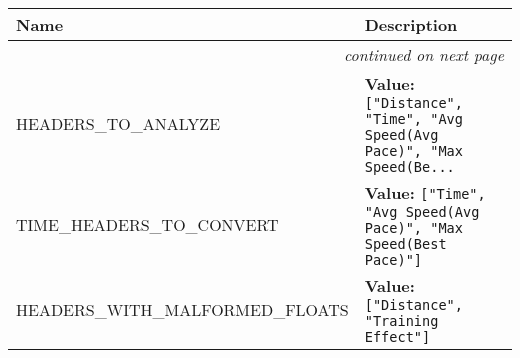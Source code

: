     \vspace{-1cm}
\hspace{\varindent}\begin{longtable}{|p{\varnamewidth}|p{\vardescrwidth}|l}
\cline{1-2}
\cline{1-2} \centering \textbf{Name} & \centering \textbf{Description}& \\
\cline{1-2}
\endhead\cline{1-2}\multicolumn{3}{r}{\small\textit{continued on next page}}\\\endfoot\cline{1-2}
\endlastfoot\raggedright H\-E\-A\-D\-E\-R\-S\-\_\-T\-O\-\_\-A\-N\-A\-L\-Y\-Z\-E\- & \raggedright \textbf{Value:} 
{\tt ["Distance", "Time", "Avg Speed(Avg Pace)", "Max Speed(Be\texttt{...}}&\\
\cline{1-2}
\raggedright T\-I\-M\-E\-\_\-H\-E\-A\-D\-E\-R\-S\-\_\-T\-O\-\_\-C\-O\-N\-V\-E\-R\-T\- & \raggedright \textbf{Value:} 
{\tt ["Time", "Avg Speed(Avg Pace)", "Max Speed(Best Pace)"]}&\\
\cline{1-2}
\raggedright H\-E\-A\-D\-E\-R\-S\-\_\-W\-I\-T\-H\-\_\-M\-A\-L\-F\-O\-R\-M\-E\-D\-\_\-F\-L\-O\-A\-T\-S\- & \raggedright \textbf{Value:} 
{\tt ["Distance", "Training Effect"]}&\\
\cline{1-2}
\end{longtable}

